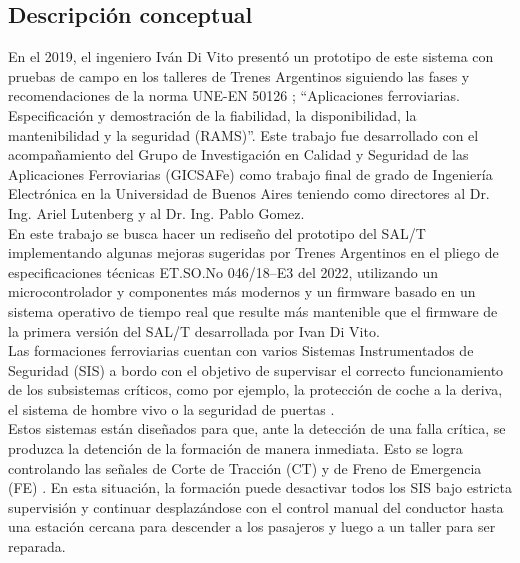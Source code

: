 

\subsection{Descripción conceptual}

En el 2019, el ingeniero Iván Di Vito presentó un prototipo de este sistema \cite{salt_ivan} con pruebas de campo en los talleres de Trenes Argentinos \cite{trenes_arg} siguiendo las fases y recomendaciones de la norma UNE-EN 50126 \cite{norma_50126};  ``Aplicaciones ferroviarias. Especificación y demostración de la fiabilidad, la disponibilidad, la mantenibilidad y la seguridad (RAMS)''. Este trabajo fue desarrollado con el acompañamiento del Grupo de Investigación en Calidad y Seguridad de las Aplicaciones Ferroviarias (GICSAFe) \cite{gicsafe} como trabajo final de grado de Ingeniería Electrónica en la Universidad de Buenos Aires teniendo como directores al Dr. Ing. Ariel Lutenberg y al Dr. Ing. Pablo Gomez. \\

En este trabajo se busca hacer un rediseño del prototipo del SAL/T implementando algunas mejoras sugeridas por Trenes Argentinos en el pliego de especificaciones técnicas ET.SO.No 046/18–E3 \cite{spec} del 2022, utilizando un microcontrolador y componentes más modernos y un firmware basado en un sistema operativo de tiempo real que resulte más mantenible que el firmware de la primera versión del SAL/T desarrollada por Ivan Di Vito. \\

Las formaciones ferroviarias cuentan con varios Sistemas Instrumentados de Seguridad (SIS) a bordo con el objetivo de supervisar el correcto funcionamiento de los subsistemas críticos, como por ejemplo, la protección de coche a la deriva, el sistema de hombre vivo o la seguridad de puertas \cite{salt_paper}. \\

Estos sistemas están diseñados para que, ante la detección de una falla crítica, se produzca la detención de la formación de manera inmediata. Esto se logra controlando las señales de Corte de Tracción (CT) y de Freno de Emergencia (FE) \cite{salt_paper}. En esta situación, la formación puede desactivar todos los SIS bajo estricta supervisión y continuar desplazándose con el control manual del conductor hasta una estación cercana para descender a los pasajeros y luego a un taller para ser reparada. \\

